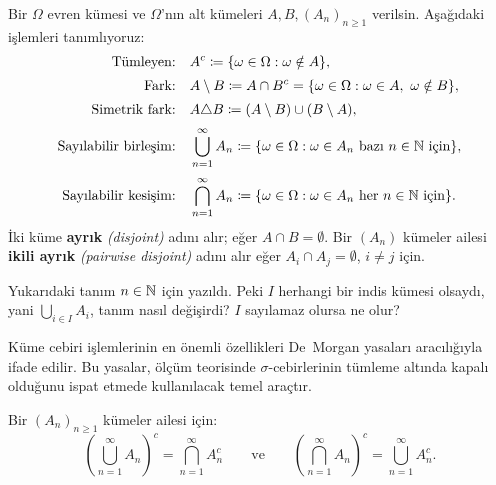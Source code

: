 \begin{tanim}\label{def:kumecebiri}
Bir $\Omega$ evren kümesi ve $\Omega$'nın alt kümeleri $A, B, (A_n)_{n \geq 1}$
verilsin. Aşağıdaki işlemleri tanımlıyoruz:
\begin{align*}
  \text{Tümleyen:}\quad
    & A^c \coloneqq \{\omega \in \Omega : \omega \notin A\}, \\[2pt]
  \text{Fark:}\quad
    & A \setminus B \coloneqq A \cap B^c
      = \{\omega \in \Omega : \omega \in A,\ \omega \notin B\}, \\[2pt]
  \text{Simetrik fark:}\quad
    & A \triangle B \coloneqq (A \setminus B) \cup (B \setminus A), \\[2pt]
  \text{Sayılabilir birleşim:}\quad
    & \bigcup_{n=1}^\infty A_n
      \coloneqq \{\omega \in \Omega : \omega \in A_n \text{ bazı } n \in \N \text{ için}\}, \\[2pt]
  \text{Sayılabilir kesişim:}\quad
    & \bigcap_{n=1}^\infty A_n
      \coloneqq \{\omega \in \Omega : \omega \in A_n \text{ her } n \in \N \text{ için}\}.
\end{align*}
İki küme \textbf{ayrık} \emph{(disjoint)} adını alır; eğer $A \cap B = \emptyset$.
Bir $(A_n)$ kümeler ailesi \textbf{ikili ayrık} \emph{(pairwise disjoint)} adını alır
eğer $A_i \cap A_j = \emptyset$, $i \neq j$ için.
\end{tanim}

\begin{kritiksorgu}
Yukarıdaki tanım $n \in \mathbb{N}$ için yazıldı. Peki $I$ herhangi bir indis
kümesi olsaydı, yani $\bigcup_{i \in I} A_i$, tanım nasıl değişirdi? $I$
sayılamaz olursa ne olur?
\end{kritiksorgu}

Küme cebiri işlemlerinin en önemli özellikleri De~Morgan yasaları aracılığıyla
ifade edilir. Bu yasalar, ölçüm teorisinde $\sigma$-cebirlerinin tümleme altında
kapalı olduğunu ispat etmede kullanılacak temel araçtır.

\begin{teorem}\label{thm:demorgan}
Bir $(A_n)_{n \geq 1}$ kümeler ailesi için:
\[
  \left(\bigcup_{n=1}^\infty A_n\right)^c = \bigcap_{n=1}^\infty A_n^c
  \qquad \text{ve} \qquad
  \left(\bigcap_{n=1}^\infty A_n\right)^c = \bigcup_{n=1}^\infty A_n^c.
\]
\end{teorem}

